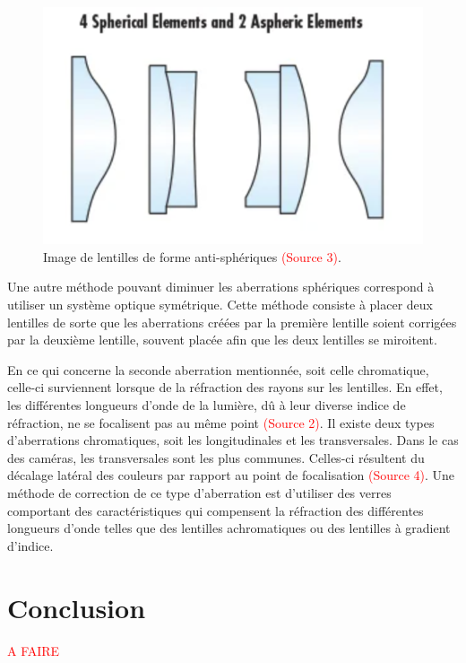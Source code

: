 \documentclass[11pt,letterpaper]{article}
\begin{document}
\begin{figure}[H]
  \centering
  \includegraphics[scale=0.4]{lentilles_aspherique.png}
  \caption{Image de lentilles de forme anti-sphériques \textcolor{red}{(Source 3)}.}
  \label{lentilles_antisph}
\end{figure}

Une autre méthode pouvant diminuer les aberrations sphériques correspond à utiliser un système optique symétrique. Cette méthode consiste à placer deux lentilles de sorte que les aberrations créées par la première lentille soient corrigées par la deuxième lentille, souvent placée afin que les deux lentilles se miroitent.

En ce qui concerne la seconde aberration mentionnée, soit celle chromatique, celle-ci surviennent lorsque de la réfraction des rayons sur les lentilles. En effet, les différentes longueurs d'onde de la lumière, dû à leur diverse indice de réfraction, ne se focalisent pas au même point \textcolor{red}{(Source 2)}. Il existe deux types d'aberrations chromatiques, soit les longitudinales et les transversales. Dans le cas des caméras, les transversales sont les plus communes. Celles-ci résultent du décalage latéral des couleurs par rapport au point de focalisation \textcolor{red}{(Source 4)}. Une méthode de correction de ce type d'aberration est d'utiliser des verres comportant des caractéristiques qui compensent la réfraction des différentes longueurs d'onde telles que des lentilles achromatiques ou des lentilles à gradient d'indice.






\section{Conclusion}

\textcolor{red}{A FAIRE}

\clearpage

% 
% 
\end{document}
